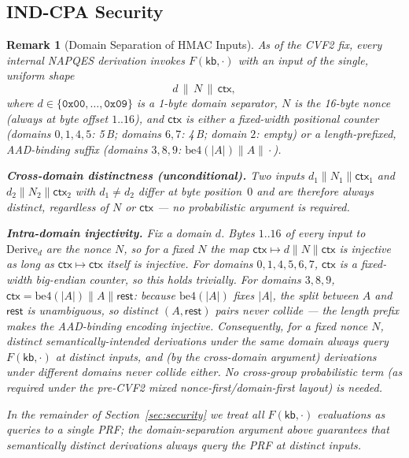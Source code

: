 \documentclass[11pt,a4paper]{article}
\newtheorem{remark}[theorem]{Remark}
\begin{document}
\subsection{IND-CPA Security}

\begin{remark}[Domain Separation of HMAC Inputs]\label{rem:domsep}
As of the CVF2 fix, every internal NAPQES derivation invokes
$F(\mathsf{kb},\cdot)$ with an input of the single, uniform shape
\[
  d \,\|\, N \,\|\, \mathsf{ctx},
\]
where $d \in \{\texttt{0x00},\ldots,\texttt{0x09}\}$ is a 1-byte domain
separator, $N$ is the 16-byte nonce (always at byte offset $1..16$), and
$\mathsf{ctx}$ is either a fixed-width positional counter (domains
$0,1,4,5$: 5\,B; domains $6,7$: 4\,B; domain $2$: empty) or a
length-prefixed, AAD-binding suffix (domains $3,8,9$:
$\mathrm{be4}(|A|) \| A \| \cdot$).

\noindent
\textbf{Cross-domain distinctness (unconditional).}
Two inputs $d_1\|N_1\|\mathsf{ctx}_1$ and $d_2\|N_2\|\mathsf{ctx}_2$ with
$d_1 \neq d_2$ differ at byte position~$0$ and are therefore always
distinct, regardless of $N$ or $\mathsf{ctx}$ — no probabilistic argument
is required.

\noindent
\textbf{Intra-domain injectivity.}
Fix a domain $d$. Bytes $1..16$ of every input to $\mathrm{Derive}_d$ are
the nonce $N$, so for a fixed $N$ the map $\mathsf{ctx} \mapsto d\|N\|\mathsf{ctx}$
is injective as long as $\mathsf{ctx} \mapsto \mathsf{ctx}$ itself is
injective. For domains $0,1,4,5,6,7$, $\mathsf{ctx}$ is a fixed-width
big-endian counter, so this holds trivially. For domains $3,8,9$,
$\mathsf{ctx} = \mathrm{be4}(|A|) \| A \| \mathsf{rest}$: because $\mathrm{be4}(|A|)$
fixes $|A|$, the split between $A$ and $\mathsf{rest}$ is unambiguous, so
distinct $(A, \mathsf{rest})$ pairs never collide — the length prefix makes
the AAD-binding encoding injective. Consequently, for a fixed nonce $N$,
distinct semantically-intended derivations under the same domain always
query $F(\mathsf{kb},\cdot)$ at distinct inputs, and (by the cross-domain
argument) derivations under different domains never collide either. No
cross-group probabilistic term (as required under the pre-CVF2 mixed
nonce-first/domain-first layout) is needed.

In the remainder of Section~\ref{sec:security} we treat all
$F(\mathsf{kb},\cdot)$ evaluations as queries to a single PRF; the
domain-separation argument above guarantees that semantically distinct
derivations always query the PRF at distinct inputs.
\end{remark}
\end{document}
